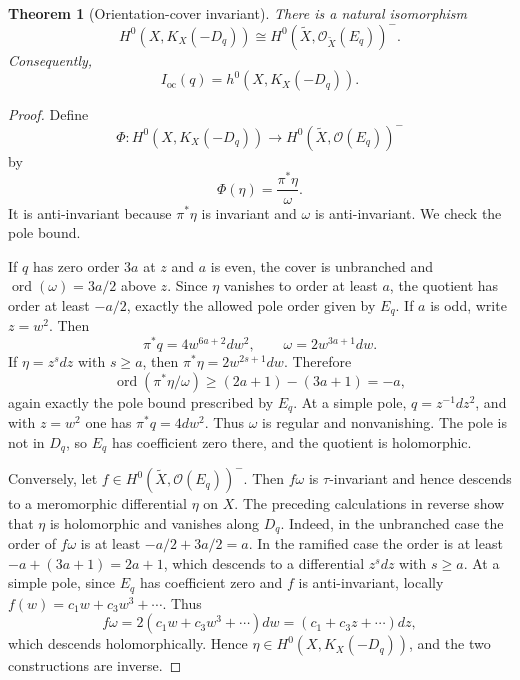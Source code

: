 \documentclass[11pt]{article}
\newtheorem{theorem}{Theorem}[section]
\theoremstyle{remark}
\newcommand{\Xt}{\widetilde X}
\newcommand{\OO}{\mathcal O}
\newcommand{\Ioc}{I_{\mathrm{oc}}}
\DeclareMathOperator{\ord}{ord}
\begin{document}
\begin{theorem}[Orientation-cover invariant]\label{thm:orientation}
There is a natural isomorphism
\[
H^0(X,K_X(-D_q))\cong H^0(\Xt,\OO_{\Xt}(E_q))^-.
\]
Consequently,
\[
\Ioc(q)=h^0(X,K_X(-D_q)).
\]
\end{theorem}
\begin{proof}
Define
\[
\Phi:H^0(X,K_X(-D_q))\longrightarrow H^0(\Xt,\OO(E_q))^-
\]
by
\[
\Phi(\eta)=\frac{\pi^*\eta}{\omega}.
\]
It is anti-invariant because $\pi^*\eta$ is invariant and $\omega$ is anti-invariant. We check the pole bound.

If $q$ has zero order $3a$ at $z$ and $a$ is even, the cover is unbranched and $\ord(\omega)=3a/2$ above $z$.
Since $\eta$ vanishes to order at least $a$, the quotient has order at least $-a/2$, exactly the allowed
pole order given by $E_q$. If $a$ is odd, write $z=w^2$. Then
\[
\pi^*q=4w^{6a+2}dw^2,\qquad \omega=2w^{3a+1}dw.
\]
If $\eta=z^s dz$ with $s\geq a$, then $\pi^*\eta=2w^{2s+1}dw$. Therefore
\[
\ord(\pi^*\eta/\omega)\geq (2a+1)-(3a+1)=-a,
\]
again exactly the pole bound prescribed by $E_q$. At a simple pole, $q=z^{-1}dz^2$, and with $z=w^2$
one has $\pi^*q=4dw^2$. Thus $\omega$ is regular and nonvanishing. The pole is not in $D_q$, so $E_q$ has
coefficient zero there, and the quotient is holomorphic.

Conversely, let $f\in H^0(\Xt,\OO(E_q))^-$. Then $f\omega$ is $\tau$-invariant and hence descends to a meromorphic
differential $\eta$ on $X$. The preceding calculations in reverse show that $\eta$ is holomorphic and
vanishes along $D_q$. Indeed, in the unbranched case the order of $f\omega$ is at least $-a/2+3a/2=a$.
In the ramified case the order is at least $-a+(3a+1)=2a+1$, which descends to a differential
$z^s dz$ with $s\geq a$. At a simple pole, since $E_q$ has coefficient zero and $f$ is anti-invariant, locally
$f(w)=c_1w+c_3w^3+\cdots$. Thus
\[
f\omega=2(c_1w+c_3w^3+\cdots)dw=(c_1+c_3z+\cdots)dz,
\]
which descends holomorphically. Hence $\eta\in H^0(X,K_X(-D_q))$, and the two constructions are
inverse.
\end{proof}
\end{document}
